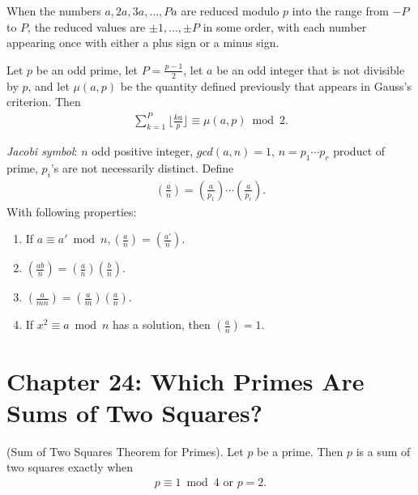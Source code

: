 \documentclass[graybox]{svmult}
\begin{document}
\begin{lemma}
When the numbers $a, 2a, 3a, \ldots, Pa$ are reduced modulo $p$ into the range from $-P$ to $P$, the reduced values are $\pm1,\ldots,\pm P$ in some order, with each number appearing once with either a plus sign or a minus sign.
\end{lemma}

\begin{lemma}
Let $p$ be an odd prime, let $P=\frac{p-1}{2}$, let $a$ be an odd integer that is not divisible by $p$, and let $\mu(a, p)$ be the quantity defined previously that appears in Gauss's criterion. Then
\begin{align*}
\sum_{k=1}^{P} \lfloor \frac{ka}{p} \rfloor \equiv \mu(a,p) \bmod 2.
\end{align*}
\end{lemma}

\begin{definition}
\textit{Jacobi symbol}: $n$ odd positive integer, $gcd(a,n)=1$, $n = p_1\cdots p_r$ product of prime, $p_i$'s are not necessarily distinct. Define
\begin{align*}
\left(\frac{a}{n}\right) = \left(\frac{a}{p_1}\right)\cdots\left(\frac{a}{p_r}\right).
\end{align*}
With following properties:
\begin{enumerate}
\item If $a \equiv a' \bmod n, \left(\frac{a}{n}\right)=\left(\frac{a'}{n}\right).$
\item $\left(\frac{ab}{n}\right)=\left(\frac{a}{n}\right)\left(\frac{b}{n}\right).$
\item $\left(\frac{a}{mn}\right)=\left(\frac{a}{m}\right)\left(\frac{a}{n}\right).$
\item If $x^2\equiv a \bmod n$ has a solution, then $\left(\frac{a}{n}\right) = 1.$
\end{enumerate}
\end{definition}

\section*{Chapter 24: Which Primes Are Sums of Two Squares?}

\begin{theorem}
(Sum of Two Squares Theorem for Primes). Let $p$ be a prime. Then $p$ is a sum of two squares exactly when
\begin{align*}
p \equiv 1 \bmod 4 \text{ or $p=2$}.
\end{align*}
\end{theorem}
\end{document}
